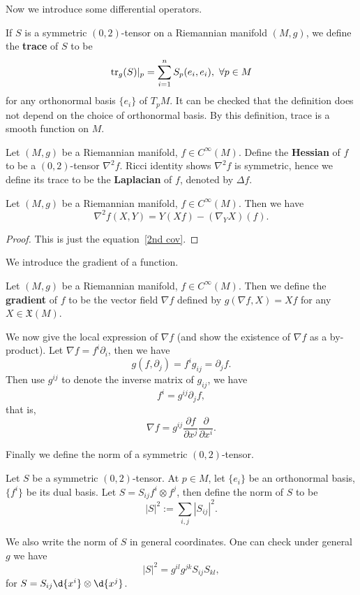 Now we introduce some differential operators.

\begin{defn}
    If $S$ is a symmetric $(0,2)$-tensor on  a Riemannian manifold $(M,g)$, we define the \textbf{trace} of $S$ to be
    \[\operatorname{tr}_g(S)|_p=\sum_{i=1}^nS_p(e_i,e_i),\ \forall p\in M\]
    for any orthonormal basis $\{e_i\}$ of $T_pM$.
    It can be checked that the definition does not depend on the choice of orthonormal basis.
    By this definition, trace is a smooth function on $M$.
\end{defn}

\begin{defn}
    Let $(M,g)$ be a Riemannian manifold, $f\in C^\infty(M)$.
    Define the \textbf{Hessian} of $f$ to be a $(0,2)$-tensor $\nabla^2f$.
    Ricci identity shows $\nabla^2f$ is symmetric, hence we define its trace to be the \textbf{Laplacian} of $f$, denoted by $\Delta f$.
\end{defn}

\begin{prop}
    Let $(M,g)$ be a Riemannian manifold, $f\in C^\infty(M)$.
    Then we have
    \[\nabla^2f(X,Y)=Y(Xf)-(\nabla_YX)(f).\]
\end{prop}
\begin{proof}
    This is just the equation~\ref{2nd cov}.
\end{proof}

We introduce the gradient of a function.
\begin{defn}
    Let $(M,g)$ be a Riemannian manifold, $f\in C^\infty(M)$.
    Then we define the \textbf{gradient} of $f$ to be the vector field $\nabla f$ defined by $g(\nabla f,X)=Xf$ for any $X\in\mathfrak{X}(M)$.
\end{defn}

We now give the local expression of $\nabla f$ (and show the existence of $\nabla f$ as a by-product).
Let $\nabla f=f^i\partial_i$, then we have
\[g(f,\partial_j)=f^ig_{ij}=\partial_jf.\]
Then use $g^{ij}$ to denote the inverse matrix of $g_{ij}$, we have
\[f^i=g^{ij}\partial_jf,\]
that is,
\[\nabla f=g^{ij}\frac{\partial f}{\partial x^{j}}\frac{\partial{}}{\partial{x^i}}.\]

Finally we define the norm of a symmetric $(0,2)$-tensor.

\begin{defn}
    Let $S$ be a symmetric $(0,2)$-tensor.
    At $p\in M$, let $\{e_i\}$ be an orthonormal basis, $\{f^i\}$ be its dual basis.
    Let $S=S_{ij}f^i\otimes f^j$, then define the norm of $S$ to be
    \[|S|^2:=\sum_{i,j}|S_{ij}|^2.\]
\end{defn}

We also write the norm of $S$ in general coordinates.
One can check under general $g$ we have
\[|S|^2=g^{il}g^{jk}S_{ij}S_{kl},\]
for $S=S_{ij}\d{x^i}\otimes\d{x^j}$.
